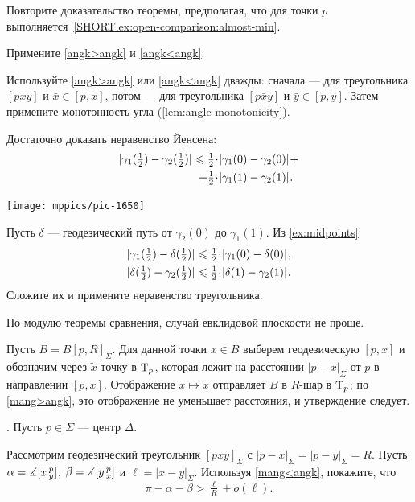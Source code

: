 \begin{multicols}{2}
Повторите доказательство теоремы, предполагая, что для точки $p$ выполняется~\ref{SHORT.ex:open-comparison:almost-min}.

Примените \ref{angk>angk} и \ref{angk<angk}.

Используйте \ref{angk>angk} или \ref{angk<angk} дважды: 
сначала --- для треугольника $[pxy]$ и $\bar x\in [p,x]$, 
потом --- для треугольника $[p\bar xy]$ и $\bar y\in [p,y]$.
Затем примените монотонность угла (\ref{lem:angle-monotonicity}).

Достаточно доказать неравенство Йенсена:
\begin{align*}
\dist{\gamma_1(\tfrac12)}{\gamma_2(\tfrac12)}{}
\le
\tfrac12\cdot&\dist{\gamma_1(0)}{\gamma_2(0)}{}
+
\\
+
\tfrac12\cdot&\dist{\gamma_1(1)}{\gamma_2(1)}{}.
\end{align*}

\begin{Figure}
\vskip-0mm
\centering
\texttt{[image: mppics/pic-1650]}
\vskip1mm
\end{Figure}

Пусть $\delta$ --- геодезический путь от $\gamma_2(0)$ до $\gamma_1(1)$.
Из \ref{ex:midpoints}
\begin{align*}
\dist{\gamma_1(\tfrac12)}{\delta(\tfrac12)}{}
&\le
\tfrac12\cdot\dist{\gamma_1(0)}{\delta(0)}{},
\\
\dist{\delta(\tfrac12)}{\gamma_2(\tfrac12)}{}
&\le
\tfrac12\cdot\dist{\delta(1)}{\gamma_2(1)}{}.
\end{align*}
Сложите их и примените неравенство треугольника.

По модулю теоремы сравнения, случай евклидовой плоскости не проще.

Пусть $B=\bar B[p,R]_\Sigma$.
Для данной точки $x\in B$ выберем геодезическую $[p,x]$ и обозначим через $\tilde x$ точку в $\mathrm{T}_p$, которая лежит на расстоянии $|p-x|_\Sigma$ от $p$ в направлении $[p,x]$.
Отображение $x\mapsto \tilde x$ отправляет $B$ в $R$-шар в $\mathrm{T}_p$;
по \mbox{\ref{mang>angk}}, это отображение не уменьшает расстояния,
и утверждение следует.

\parbf{\ref{ex:disc-}}.
Пусть $p\in\Sigma$ --- центр $\Delta$. 

Рассмотрим геодезический треугольник $[pxy]_\Sigma$ с $|p-x|_\Sigma=|p-y|_\Sigma=R$.
Пусть $\alpha=\measuredangle[x\,{}^{p}_{y}]$, 
$\beta=\measuredangle[y\,{}^{p}_{x}]$ и $\ell=|x-y|_\Sigma$.
Используя \mbox{\ref{mang<angk}}, покажите, что 
\[\pi-\alpha-\beta>\tfrac\ell R+o(\ell).\]


\end{multicols}
